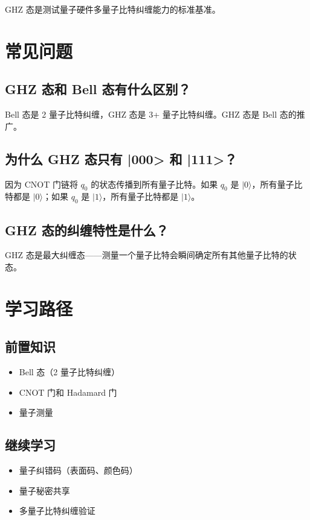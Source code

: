 \documentclass[12pt,a4paper]{article}
\begin{document}
GHZ 态是测试量子硬件多量子比特纠缠能力的标准基准。

\section{常见问题}

\subsection{GHZ 态和 Bell 态有什么区别？}

Bell 态是 2 量子比特纠缠，GHZ 态是 3+ 量子比特纠缠。GHZ 态是 Bell 态的推广。

\subsection{为什么 GHZ 态只有 |000> 和 |111>？}

因为 CNOT 门链将 $q_0$ 的状态传播到所有量子比特。如果 $q_0$ 是 $|0\rangle$，所有量子比特都是 $|0\rangle$；如果 $q_0$ 是 $|1\rangle$，所有量子比特都是 $|1\rangle$。

\subsection{GHZ 态的纠缠特性是什么？}

GHZ 态是最大纠缠态——测量一个量子比特会瞬间确定所有其他量子比特的状态。

\section{学习路径}

\subsection{前置知识}
\begin{itemize}
  \item Bell 态（2 量子比特纠缠）
  \item CNOT 门和 Hadamard 门
  \item 量子测量
\end{itemize}

\subsection{继续学习}
\begin{itemize}
  \item 量子纠错码（表面码、颜色码）
  \item 量子秘密共享
  \item 多量子比特纠缠验证
\end{itemize}
\end{document}
